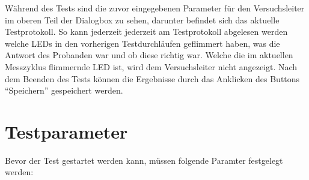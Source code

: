 \documentclass[11pt,accentcolor=tud2a,colorback,noheadingspace]{tudreport}
\begin{document}
Während des Tests sind die zuvor eingegebenen Parameter für den Versuchsleiter 
im oberen Teil der Dialogbox zu sehen, darunter befindet sich das aktuelle 
Testprotokoll. So kann jederzeit jederzeit am Testprotokoll abgelesen werden 
welche LEDs in den vorherigen Testdurchläufen geflimmert haben, was die Antwort 
des Probanden war und ob diese richtig war. Welche die im aktuellen Messzyklus 
flimmernde LED ist, wird dem Versuchsleiter nicht angezeigt. Nach dem Beenden 
des Tests können die Ergebnisse durch das Anklicken des Buttons ``Speichern'' 
gespeichert werden.


\section{Testparameter}
\label{tests:test-parameter}\label{tests:testparameter}
Bevor der Test gestartet werden kann, müssen folgende Paramter festgelegt werden:
\end{document}
